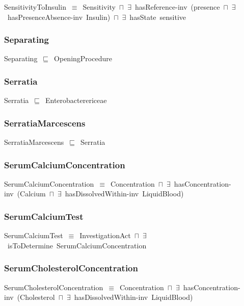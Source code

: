 \documentclass{article}
\begin{document}
SensitivityToInsulin~\ensuremath{\equiv}~Sensitivity~\ensuremath{\sqcap}~\ensuremath{\exists}~hasReference-inv~(presence~\ensuremath{\sqcap}~\ensuremath{\exists}~hasPresenceAbsence-inv~Insulin)~\ensuremath{\sqcap}~\ensuremath{\exists}~hasState~sensitive

\subsubsection*{Separating}

Separating~\ensuremath{\sqsubseteq}~OpeningProcedure~

\subsubsection*{Serratia}

Serratia~\ensuremath{\sqsubseteq}~Enterobacterericeae~

\subsubsection*{SerratiaMarcescens}

SerratiaMarcescens~\ensuremath{\sqsubseteq}~Serratia~

\subsubsection*{SerumCalciumConcentration}

SerumCalciumConcentration~\ensuremath{\equiv}~Concentration~\ensuremath{\sqcap}~\ensuremath{\exists}~hasConcentration-inv~(Calcium~\ensuremath{\sqcap}~\ensuremath{\exists}~hasDissolvedWithin-inv~LiquidBlood)

\subsubsection*{SerumCalciumTest}

SerumCalciumTest~\ensuremath{\equiv}~InvestigationAct~\ensuremath{\sqcap}~\ensuremath{\exists}~isToDetermine~SerumCalciumConcentration

\subsubsection*{SerumCholesterolConcentration}

SerumCholesterolConcentration~\ensuremath{\equiv}~Concentration~\ensuremath{\sqcap}~\ensuremath{\exists}~hasConcentration-inv~(Cholesterol~\ensuremath{\sqcap}~\ensuremath{\exists}~hasDissolvedWithin-inv~LiquidBlood)
\end{document}
